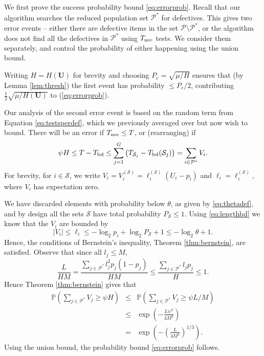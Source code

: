 \documentclass[conference]{IEEEtran}
\newcommand{\vc}[1]{{\mathbf{ #1}}}
\newcommand{\pr}{{\mathbb{P}}}
\newcommand{\setS}{{\mathcal{S}}}
\newcommand{\setP}{{\mathcal{P}}}
\newcommand{\nec}{{\rm nec}}
\newcommand{\bd}{{\rm bd}}
\begin{document}
\begin{IEEEproof}
We first prove the success probability bound \eqref{eq:errorprob}.
 Recall that our algorithm searches the reduced population set $\setP^*$ for defectives.
This gives two  error events -- either there are defective items in the set $\setP \setminus \setP^*$, or the algorithm does not find all the defectives in $\setP^*$ using
$T_{\nec}$ tests. We consider them separately, and control the probability of either happening using the union bound.

Writing $H = H(\vc{U})$  for brevity and
choosing $ P_e = \sqrt{ \mu/H }$ ensures that (by Lemma \ref{lem:thresh}) the first event has probability $\leq P_e/2$, contributing 
$\frac{1}{2} \sqrt{ \mu/H(\vc{U})}$ to (\ref{eq:errorprob}).


Our analysis of the second error event is based on  the 
random term   from
Equation \eqref{eq:testsperdef}, which we previously averaged over but now wish to bound. There will be an error
if $T_{\nec} \leq T$, or (rearranging) if 
$$\psi H \leq T - T_{\bd} \leq \sum_{j=1}^G \left(T_{\setS_j} - T_{\bd}(\setS_j) \right) = \sum_{i \in \setP^*} V_i.$$  For brevity,   for $i \in \setS$, we write 
$V_i = V_ i^{(\setS)} = \ell_i^{(\setS)} (U_i - p_i)$ and $\ell_i = \ell_i^{(\setS)}$, where $V_i$ has expectation zero. 

We have discarded elements with probability below $\theta$, as given by \eqref{eq:thetadef}, and by design all the sets $\setS$ have total probability $P_{\setS} \leq 1$. Using
 \eqref{eq:lengthbd} we know that the $V_i$ are bounded by
\begin{equation} | V_i|  \leq \ell_i \leq -\log_2 p_i + \log_2 P_{\setS} + 1 \leq - \log_2 \theta + 1. \label{eq:vbd} \end{equation}
Hence, the conditions of Bernstein's inequality, Theorem \ref{thm:bernstein}, are satisfied. 
Observe that since all $l_j \leq M$,
$$ \frac{ L}{H M} = \frac{ \sum_{j \in \setP^*} l_j^2 p_j (1-p_j)} { H M} \leq \frac{ \sum_{j \in \setP^*} l_j p_j } { H} \leq 1 .$$
Hence Theorem \ref{thm:bernstein} gives that 
\begin{eqnarray*}
 \pr \left( \sum_{j \in \setP^*} V_j \geq \psi H \right) 
& \leq &
 \pr \left( \sum_{j \in \setP^*} V_j \geq \psi L/M \right) \\
& \leq &  \exp \left( - \frac{L \psi^2}{4  M^2 } \right) \\ 
& = & \exp \left( - \left( \frac{L}{4  M^2 }  \right)^{1/3}
\right).
\end{eqnarray*}
Using the union bound, the probability bound \eqref{eq:errorprob} follows.


\end{IEEEproof}
\end{document}
